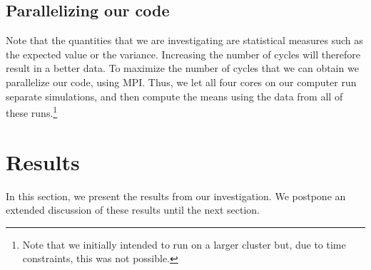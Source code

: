 \documentclass[a4paper, 10pt]{article}
\begin{document}
\subsection{Parallelizing our code}
Note that the quantities that we are investigating are statistical measures such as the expected value or the variance. Increasing the number of cycles will therefore result in a better data. To maximize the number of cycles that we can obtain we parallelize our code, using MPI. Thus, we let all four cores on our computer run separate simulations, and then compute the means using the data from all of these runs.\footnote{Note that we initially intended to run on a larger cluster but, due to time constraints, this was not possible.}
\section{Results}
In this section, we present the results from our investigation. We postpone an extended discussion of these results until the next section.
\end{document}
